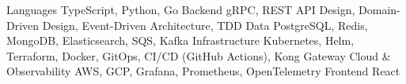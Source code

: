 
\begin{cvskills}
  \cvskill
    {Languages}
    {TypeScript, Python, Go}
  \cvskill
    {Backend}
    {gRPC, REST API Design, Domain-Driven Design, Event-Driven Architecture, TDD}
  \cvskill
    {Data}
    {PostgreSQL, Redis, MongoDB, Elasticsearch, SQS, Kafka}
  \cvskill
    {Infrastructure}
    {Kubernetes, Helm, Terraform, Docker, GitOps, CI/CD (GitHub Actions), Kong Gateway}
  \cvskill
    {Cloud \& Observability}
    {AWS, GCP, Grafana, Prometheus, OpenTelemetry}
  \cvskill
    {Frontend}
    {React}
\end{cvskills}
